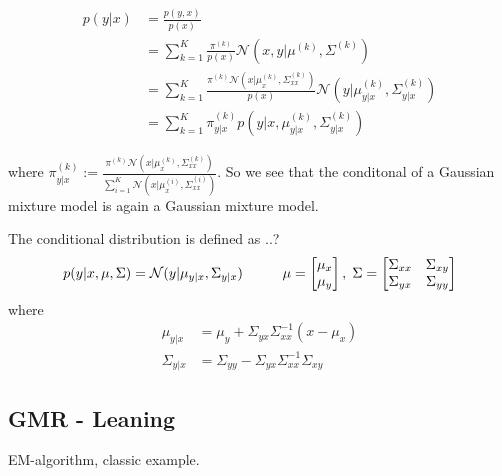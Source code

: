 \begin{align}
    p(y|x) &= \frac{p(y,x)}{p(x)}\\
    &= \sum_{k=1}^K \frac{\pi^{(k)}}{p(x)} \mathcal{N}(x,y|\mu^{(k)},\Sigma^{(k)})\\
    &=  \sum_{k=1}^K \frac{\pi^{(k)} \mathcal{N}(x|\mu_{x}^{(k)},\Sigma_{xx}^{(k)})}{p(x)}\mathcal{N}(y|\mu_{y|x}^{(k)},\Sigma_{y|x}^{(k)})\\
    &=  \sum_{k=1}^K \pi_{y|x}^{(k)} p(y|x,\mu_{y|x}^{(k)},\Sigma_{y|x}^{(k)})
\end{align}

where $\pi_{y|x}^{(k)} := \frac{\pi^{(k)} \mathcal{N}(x|\mu_{x}^{(k)},\Sigma_{xx}^{(k)})}
{\sum_{i=1}^K \mathcal{N}(x|\mu_{x}^{(i)},\Sigma_{xx}^{(i)})}$. So we see that 
the conditonal of a Gaussian mixture model is again a Gaussian mixture model.


\begin{testexample2}
    The conditional distribution is defined as \cite{bishop} ..?
    $$p(y|x,\mu, \Sigma) = \mathcal{N}(y|\mu_{y|x},\Sigma_{y|x} )\hspace{1cm} \mu=\begin{bmatrix}
        \mu_x \\ \mu_y
    \end{bmatrix},\hspace{0.1cm} \Sigma = \begin{bmatrix}
        \Sigma_{xx} & \Sigma_{xy}\\ \Sigma_{yx}& \Sigma_{yy}
    \end{bmatrix}$$ 
    where 
    \begin{align}
        \mu_{y|x} &= \mu_y+\Sigma_{yx}\Sigma_{xx}^{-1}(x-\mu_x)\\
        \Sigma_{y|x} &= \Sigma_{yy}-\Sigma_{yx}\Sigma_{xx}^{-1}\Sigma_{xy} 
    \end{align}
    
\end{testexample2}


\subsection{GMR - Leaning}

EM-algorithm, classic example. 
